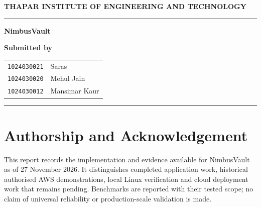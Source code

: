 \documentclass[11pt,a4paper,oneside]{report}
\newcommand{\SubmissionDate}{November 27, 2026} %
\newcommand{\EvidenceDate}{27 November 2026}
\begin{document}
\begin{titlepage}\centering{}
\vspace*{4mm}
{\large\bfseries THAPAR INSTITUTE OF ENGINEERING AND TECHNOLOGY\par}
\vspace{2mm}{(Deemed to be University), Patiala\par}
\vspace{6mm}\noindent\rule{\linewidth}{.7pt}\par
\vspace{10mm}{\large\bfseries Department of Computer Science and Engineering\par}
\vspace{6mm}{\large UCS503P\par}
\vfill{\Huge\bfseries\color{navy} NimbusVault\par}
\vspace{10mm}{\Large\bfseries Final Project Report\par}
\vspace{6mm}{B.E./B.Tech. Computer Engineering, Third Year\par}
\vfill{\bfseries Submitted by\par}\vspace{3mm}
\begin{tabular}{ll}\texttt{1024030021}&Saras\\\texttt{1024030020}&Mehul Jain\\\texttt{1024030012}&Mansimar Kaur\end{tabular}\par
\vspace{9mm}{\bfseries Submitted to\par}\vspace{3mm}{Dr. Paramveer Sidhu\par}
\vfill\noindent\rule{\linewidth}{.4pt}\par\vspace{5mm}{\SubmissionDate\par}
\end{titlepage}
\chapter*{Authorship and Acknowledgement}
This report records the implementation and evidence available for NimbusVault as of \EvidenceDate. It distinguishes completed application work, historical authorised AWS demonstrations, local Linux verification and cloud deployment work that remains pending. Benchmarks are reported with their tested scope; no claim of universal reliability or production-scale validation is made.
\end{document}
